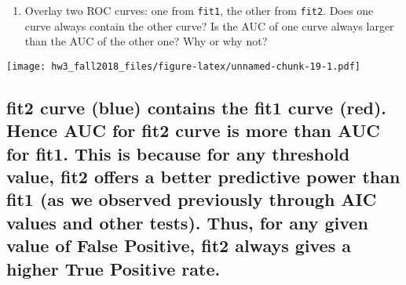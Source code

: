 \documentclass[]{article}
\newenvironment{Shaded}{\begin{snugshade}}{\end{snugshade}}
\newcommand{\KeywordTok}[1]{\textcolor[rgb]{0.13,0.29,0.53}{\textbf{#1}}}
\newcommand{\DataTypeTok}[1]{\textcolor[rgb]{0.13,0.29,0.53}{#1}}
\newcommand{\DecValTok}[1]{\textcolor[rgb]{0.00,0.00,0.81}{#1}}
\newcommand{\StringTok}[1]{\textcolor[rgb]{0.31,0.60,0.02}{#1}}
\newcommand{\OperatorTok}[1]{\textcolor[rgb]{0.81,0.36,0.00}{\textbf{#1}}}
\newcommand{\NormalTok}[1]{#1}
\providecommand{\tightlist}{%
  \setlength{\itemsep}{0pt}\setlength{\parskip}{0pt}}
\begin{document}
\begin{enumerate}
\def\labelenumi{\alph{enumi}.}
\setcounter{enumi}{1}
\tightlist
\item
  Overlay two ROC curves: one from \texttt{fit1}, the other from
  \texttt{fit2}. Does one curve always contain the other curve? Is the
  AUC of one curve always larger than the AUC of the other one? Why or
  why not?
\end{enumerate}

\begin{Shaded}
\end{Shaded}

\texttt{[image: hw3\_fall2018\_files/figure-latex/unnamed-chunk-19-1.pdf]}

\subsection{fit2 curve (blue) contains the fit1 curve (red). Hence AUC
for fit2 curve is more than AUC for fit1. This is because for any
threshold value, fit2 offers a better predictive power than fit1 (as we
observed previously through AIC values and other tests). Thus, for any
given value of False Positive, fit2 always gives a higher True Positive
rate.}\label{fit2-curve-blue-contains-the-fit1-curve-red.-hence-auc-for-fit2-curve-is-more-than-auc-for-fit1.-this-is-because-for-any-threshold-value-fit2-offers-a-better-predictive-power-than-fit1-as-we-observed-previously-through-aic-values-and-other-tests.-thus-for-any-given-value-of-false-positive-fit2-always-gives-a-higher-true-positive-rate.}
\end{document}
